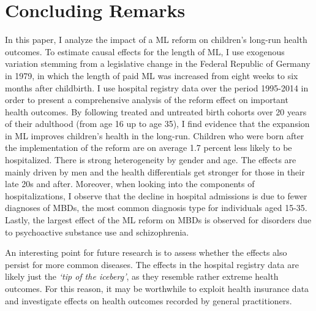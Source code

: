\bigskip
\section{Concluding Remarks}\label{sec_mlch:conclusion}

In this paper, I analyze the impact of a ML reform on children's long-run health outcomes. To estimate causal effects for the length of ML, I use exogenous variation stemming from a legislative change in the Federal Republic of Germany in 1979, in which the length of paid ML was increased from eight weeks to six months after childbirth. I use hospital registry data over the period 1995-2014 in order to present a comprehensive analysis of the reform effect on important health outcomes. By following treated and untreated birth cohorts over 20 years of their adulthood (from age 16 up to age 35), I find evidence that the expansion in ML improves children's health in the long-run. Children who were born after the implementation of the reform are on average 1.7 percent less likely to be hospitalized. There is strong heterogeneity by gender and age. The effects are mainly driven by men and the health differentials get stronger for those in their late 20s and after. Moreover, when looking into the components of hospitalizations, I observe that the decline in hospital admissions is due to fewer diagnoses of MBDs, the most common diagnosis type for individuals aged 15-35. Lastly, the largest effect of the ML reform on MBDs is observed for disorders due to psychoactive substance use and schizophrenia.


An interesting point for future research is to assess whether the effects also persist for more common diseases. The effects in the hospital registry data are likely just the \textit{`tip of the iceberg'}, as they resemble rather extreme health outcomes. For this reason, it may be worthwhile to exploit health insurance data and investigate effects on health outcomes recorded by general practitioners.



